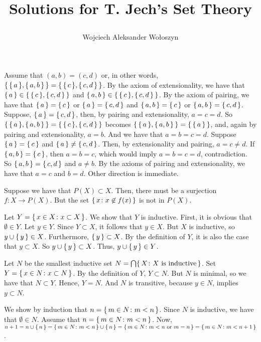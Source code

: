 \documentclass[12pt]{article}
\title{
\vspace{-2cm}
  \author{Wojciech Aleksander Wołoszyn}
  Solutions for
  T. Jech's Set Theory \\
}
\theoremstyle{definition}
\newenvironment{customthm}[1]
  {\renewcommand\theinnercustomthm{#1}\innercustomthm}
  {\endinnercustomthm}
\begin{document}
\maketitle

\begin{customthm}{I.1.1}
    Assume that $(a,b)=(c,d)$ or, in other words, $\{\,{\{\,{a}\,\},\{\,{a,b}\,\}}\,\} = \{\,{\{\,{c}\,\},\{\,{c,d}\,\}}\,\}$. By the axiom of extensionality, we have that $\{\,{a}\,\} \in \{\,{\{\,{c}\,\},\{\,{c,d}\,\}}\,\}$ and $\{\,{a,b}\,\} \in \{\,{\{\,{c}\,\},\{\,{c,d}\,\}}\,\}$. By the axiom of pairing, we have that $\{\,{a}\,\} = \{\,{c}\,\}$ or $\{\,{a}\,\} = \{\,{c,d}\,\}$ and $\{\,{a,b}\,\} = \{\,{c}\,\}$ or $\{\,{a,b}\,\} = \{\,{c,d}\,\}$. Suppose, $\{\,{a}\,\} = \{\,{c,d}\,\}$, then, by pairing and extensionality, $a=c=d$. So $\{\,{\{\,{a}\,\},\{\,{a,b}\,\}}\,\} = \{\,{\{\,{c}\,\},\{\,{c,d}\,\}}\,\}$ becomes $\{\,{\{\,{a}\,\},\{\,{a,b}\,\}}\,\} = \{\,{\{\,{a}\,\}}\,\}$, and, again by pairing and extensionality, $a=b$. And we have that $a=b=c=d$. Suppose $\{\,{a}\,\} = \{\,{c}\,\}$ and $\{\,{a}\,\} \neq \{\,{c,d}\,\}$. Then, by extensionality and pairing, $a=c \neq d$. If $\{\,{a,b}\,\} = \{\,{c}\,\}$, then $a=b=c$, which would imply $a=b=c=d$, contradiction. So $\{\,{a,b}\,\} = \{\,{c,d}\,\}$ and $a \neq b$. By the axioms of pairing and extensionality, we have that $a=c$ and $b=d$. Other direction is immediate.
\end{customthm}

\begin{customthm}{I.1.2}
    Suppose we have that $P(X) \subset X$. Then, there must be a surjection $f \colon X \to P(X)$. But the set $\{\,{x \colon x \not\in f(x)}\,\}$ is not in $P(X)$.
\end{customthm}

\begin{customthm}{I.1.3}\label{ex:set-of-elements-of-inductive-set-is-inductive}
    Let $Y=\{\,{x \in X \colon x \subset X}\,\}$. We show that $Y$ is inductive. First, it is obvious that $\emptyset \in Y$. Let $y \in Y$. Since $Y \subset X$, it follows that $y \in X$. But $X$ is inductive, so $y \cup \{\,{y}\,\} \in X$. Furthermore, $\{\,{y}\,\} \subset X$. By the definition of $Y$, it is also the case that $y \subset X$. So $y \cup \{\,{y}\,\} \subset X$. Thus, $y \cup \{\,{y}\,\} \in Y$.
    
    Let $N$ be the smallest inductive set $N = \bigcap \{\,{X \colon X \text{ is inductive}}\,\}$. Set $Y = \{\,{x \in N \colon x \subset N}\,\}$. By the definition of $Y$, $Y \subset N$. But $N$ is minimal, so we have that $N \subset Y$. Hence, $Y=N$. And $N$ is transitive, because $y \in N$, implies $y \subset N$.
    
    We show by induction that $n = \{\,{m \in N \colon m < n}\,\}$. Since $N$ is inductive, we have that $\emptyset \in N$. Assume that $n = \{\,{m \in N \colon m < n}\,\}$. Now, $n+1 = n \cup \{\,{n}\,\} = \{\,{m \in N \colon m < n}\,\} \cup \{\,{n}\,\} = \{\,{m \in N \colon m < n \text{ or } m=n}\,\} = \{\,{m \in N \colon m < n + 1}\,\}$.
\end{customthm}
\end{document}
